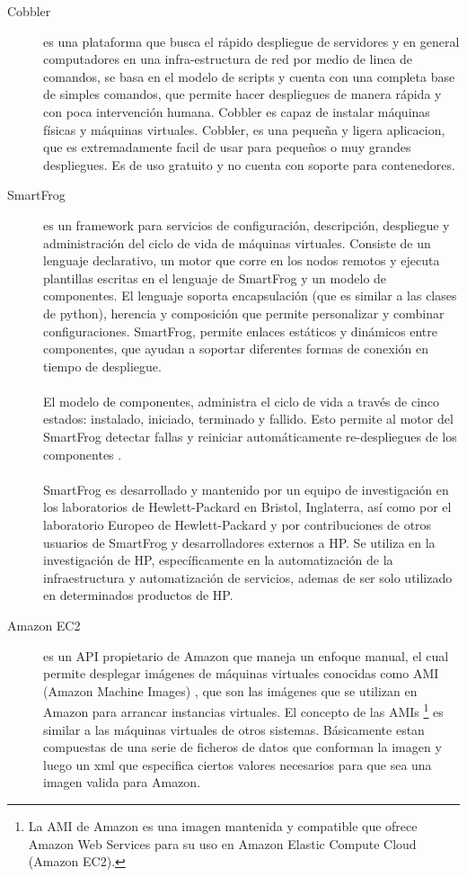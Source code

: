 \documentclass[conference, spanish]{IEEEtran}
\begin{document}
\begin{description}
\item [Cobbler]
 es una plataforma que busca el rápido despliegue de servidores y en general computadores en una infra-estructura de red por medio de linea de comandos, se basa en el modelo de scripts y cuenta con una completa base de simples comandos, que permite hacer despliegues de manera rápida y con poca intervención humana. Cobbler es capaz de instalar máquinas físicas y máquinas virtuales. Cobbler, es una pequeña y ligera aplicacion, que es extremadamente facil de usar para pequeños o muy grandes despliegues. Es de uso gratuito y no cuenta con soporte para contenedores. \cite{Cobbler15}

\item [SmartFrog]
 es un framework para servicios de configuración, descripción, despliegue y administración del ciclo de vida de máquinas virtuales. Consiste de un lenguaje declarativo, un motor que corre en los nodos remotos y ejecuta plantillas escritas en el lenguaje de SmartFrog y un modelo de componentes. El lenguaje soporta encapsulación (que es similar a las clases de python), herencia y composición que permite personalizar y combinar configuraciones. SmartFrog, permite enlaces estáticos y dinámicos entre componentes, que ayudan a soportar diferentes formas de conexión en tiempo de despliegue.\\
\\
El modelo de componentes, administra el ciclo de vida a través de cinco estados: instalado, iniciado, terminado y fallido. Esto permite al motor del SmartFrog detectar fallas y reiniciar automáticamente re-despliegues de los componentes \cite{Smart09}.\\
\\
SmartFrog es desarrollado y mantenido por un equipo de investigación en los laboratorios de Hewlett-Packard en Bristol, Inglaterra, así como por el laboratorio Europeo de Hewlett-Packard y por contribuciones de otros usuarios de SmartFrog y desarrolladores externos a HP. Se utiliza en la investigación de HP, específicamente en la automatización de la infraestructura y automatización de servicios, ademas de ser solo utilizado en determinados productos de HP.

\item [Amazon EC2]
es un API propietario de Amazon que maneja un enfoque manual, el cual permite desplegar imágenes de máquinas virtuales conocidas como AMI (Amazon Machine Images) \cite{Amazon16}, que son las imágenes que se utilizan en Amazon para arrancar instancias virtuales. El concepto de las AMIs \footnote{La AMI de Amazon es una imagen mantenida y compatible que ofrece Amazon Web Services para su uso en Amazon Elastic Compute Cloud (Amazon EC2).} es similar a las máquinas virtuales de otros sistemas. Básicamente estan compuestas de una serie de ficheros de datos que conforman la imagen y luego un xml que especifica ciertos valores necesarios para que sea una imagen valida para Amazon. 


\end{description}
\end{document}
